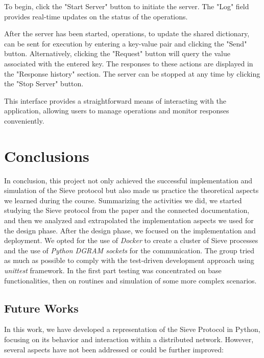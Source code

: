 \documentclass{scrartcl}
\begin{document}
To begin, click the "Start Server" button to initiate the server. The "Log" field provides real-time updates on the status of the operations.

After the server has been started, operations, to update the shared dictionary, can be sent for execution by entering a key-value pair and clicking the "Send" button. Alternatively, clicking the "Request" button will query the value associated with the entered key. The responses to these actions are displayed in the "Response history" section.
The server can be stopped at any time by clicking the "Stop Server" button.

This interface provides a straightforward means of interacting with the application, allowing users to manage operations and monitor responses conveniently.

\section{Conclusions}

In conclusion, this project not only achieved the successful implementation and simulation of the Sieve protocol but also made us practice the theoretical aspects we learned during the course.
Summarizing the activities we did, we started studying the Sieve protocol from the paper \cite{paper} and the connected documentation, and then we analyzed and extrapolated the implementation aspects we used for the design phase. After the design phase, we focused on the implementation and deployment. We opted for the use of \textit{Docker} to create a cluster of Sieve processes and the use of \textit{Python DGRAM sockets} for the communication. The group tried as much as possible to comply with the test-driven development approach using \textit{unittest} framework. In the first part testing was concentrated on base functionalities, then on routines and simulation of some more complex scenarios. 

\subsection{Future Works}

In this work, we have developed a representation of the Sieve Protocol in Python, focusing on its behavior and interaction within a distributed network. However, several aspects have not been addressed or could be further improved:
\end{document}
